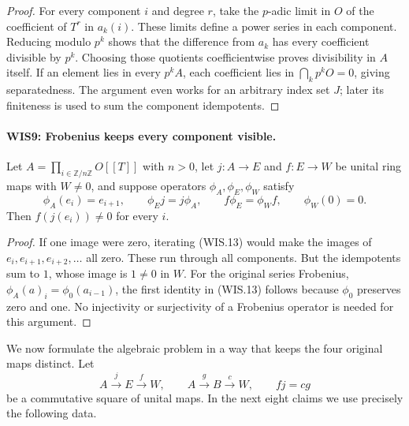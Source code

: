 \documentclass[11pt,a4paper]{article}
\numberwithin{equation}{section}
\theoremstyle{remark}\newtheorem{remark}[theorem]{Remark}
\begin{document}
\begin{proof}
For every component $i$ and degree $r$, take the $p$-adic
limit in $O$ of the coefficient of $T^r$ in $a_k(i)$.
These limits define a power series in each component.
Reducing modulo $p^k$ shows that the difference from $a_k$
has every coefficient divisible by $p^k$. Choosing those
quotients coefficientwise proves divisibility in $A$ itself.
If an element lies in every $p^kA$, each coefficient lies
in $\bigcap_kp^kO=0$, giving separatedness. The argument
even works for an arbitrary index set $J$; later its
finiteness is used to sum the component idempotents.
\end{proof}

\paragraph{WIS9: Frobenius keeps every component visible.}
\label{claim:WIS9}
Let $A=\prod_{i\in\mathbb Z/n\mathbb Z}O[[T]]$ with $n>0$,
let $j:A\to E$ and $f:E\to W$ be unital ring maps with
$W\ne0$, and suppose operators $\phi_A,\phi_E,\phi_W$ satisfy
\[
 \phi_A(e_i)=e_{i+1},\qquad
 \phi_Ej=j\phi_A,\qquad f\phi_E=\phi_Wf,\qquad \phi_W(0)=0.
                                                               \tag{WIS.13}
\]
Then $f(j(e_i))\ne0$ for every $i$.

\begin{proof}
If one image were zero, iterating (WIS.13) would make
the images of $e_i,e_{i+1},e_{i+2},\ldots$ all zero.
These run through all components. But the idempotents sum
to $1$, whose image is $1\ne0$ in $W$.
For the original series Frobenius,
$\phi_A(a)_i=\phi_0(a_{i-1})$, the first identity in
(WIS.13) follows because $\phi_0$ preserves zero and one.
No injectivity or surjectivity of a Frobenius operator
is needed for this argument.
\end{proof}

We now formulate the algebraic problem in a way that keeps
the four original maps distinct. Let
\[
 A\xrightarrow{j}E\xrightarrow{f}W,\qquad
 A\xrightarrow{g}B\xrightarrow{c}W,\qquad fj=cg              \tag{WIS.14}
\]
be a commutative square of unital maps. In the next eight claims
we use precisely the following data.
\end{document}

